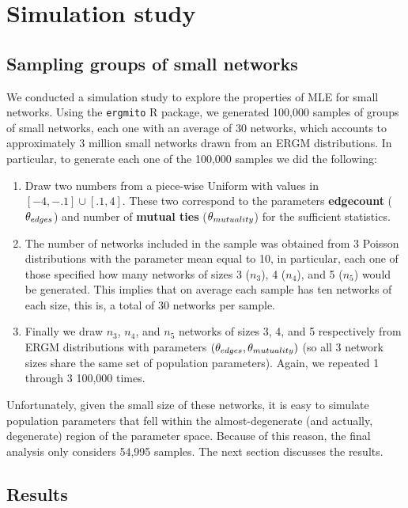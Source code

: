 \documentclass[12pt]{article}
\begin{document}
\pagebreak
\section{Simulation study}

\subsection{Sampling groups of small networks}

We conducted a simulation study to explore the properties of MLE for small networks. Using the \texttt{ergmito} R package, we generated 100,000 samples of groups of small networks, each one with an average of 30 networks, which accounts to approximately 3 million small networks drawn from an ERGM distributions. In particular, to generate each one of the 100,000 samples we did the following:

\begin{enumerate}

\item Draw two numbers from a piece-wise Uniform with values in $[-4, -.1]\cup[.1, 4]$. These two correspond to the parameters \textbf{edgecount} ($\theta_{edges}$) and number of \textbf{mutual ties} ($\theta_{mutuality}$) for the sufficient statistics.

\item The number of networks included in the sample was obtained from 3 Poisson distributions with the parameter mean equal to 10, in particular, each one of those specified how many networks of sizes 3 ($n_3$), 4 ($n_4$), and 5 ($n_5$) would be generated. This implies that on average each sample has ten networks of each size, this is, a total of 30 networks per sample.

\item Finally we draw $n_3$, $n_4$, and $n_5$ networks of sizes 3, 4, and 5 respectively from ERGM distributions with parameters $(\theta_{edges}, \theta_{mutuality})$ (so all 3 network sizes share the same set of population parameters). Again, we repeated 1 through 3 100,000 times.
\end{enumerate}

Unfortunately, given the small size of these networks, it is easy to simulate population parameters that fell within the almost-degenerate (and actually, degenerate) region of the parameter space. Because of this reason, the final analysis only considers 54,995 samples. The next section discusses the results.

\subsection{Results}
\end{document}
